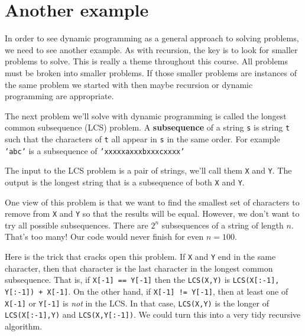 \section{Another example}


In order to see dynamic programming as a general approach to solving problems, we need to see another example.
As with recursion, the key is to look for smaller problems to solve.
This is really a theme throughout this course.
All problems must be broken into smaller problems.
If those smaller problems are instances of the same problem we started with then maybe recursion or dynamic programming are appropriate.


The next problem we'll solve with dynamic programming is called the longest common subsequence (LCS) problem.
A \textbf{subsequence} of a string \texttt{s} is string \texttt{t} such that the characters of \texttt{t} all appear in \texttt{s} in the same order.
For example \texttt{'abc'} is a subsequence of \texttt{'xxxxxaxxxbxxxcxxxx'}


The input to the LCS problem is a pair of strings, we'll call them \texttt{X} and \texttt{Y}.
The output is the longest string that is a subsequence of both \texttt{X} and \texttt{Y}.


One view of this problem is that we want to find the smallest set of characters to remove from \texttt{X} and \texttt{Y} so that the results will be equal.
However, we don't want to try all possible subsequences.
There are $2^n$ subsequences of a string of length $n$.
That's too many!
Our code would never finish for even $n = 100$.


Here is the trick that cracks open this problem.
If \texttt{X} and \texttt{Y} end in the same character, then that character is the last character in the longest common subsequence.
That is, if \texttt{X[-1] == Y[-1]} then the \texttt{LCS(X,Y)} is \texttt{LCS(X[:-1], Y[:-1]) + X[-1]}.
On the other hand, if \texttt{X[-1] != Y[-1]}, then at least one of \texttt{X[-1]} or \texttt{Y[-1]} is \emph{not} in the LCS.
In that case, \texttt{LCS(X,Y)} is the longer of \texttt{LCS(X[:-1],Y)} and \texttt{LCS(X,Y[:-1])}.
We could turn this into a very tidy recursive algorithm.

